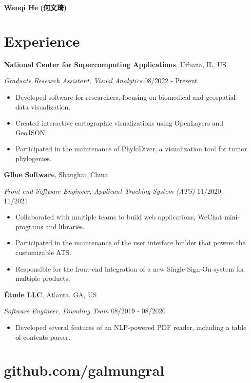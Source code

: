 \documentclass[12pt]{article}
\begin{document}
{\Huge\bf Wenqi He} {\Large\bf\cjkfont (何文琦)}

\section*{Experience}

\textbf{National Center for Supercomputing Applications}, Urbana, IL, US

\textit{Graduate Research Assistant, Visual Analytics} \hfill 08/2022 - Present

\begin{itemize}
\item Developed software for researchers, focusing on biomedical and geospatial data visualization.
\item Created interactive cartographic visualizations using OpenLayers and GeoJSON.
\item Participated in the maintenance of PhyloDiver, a visualization tool for tumor phylogenies.
\end{itemize}

\textbf{Gllue Software}, Shanghai, China

\textit{Front-end Software Engineer, Applicant Tracking System (ATS)} \hfill 11/2020 - 11/2021

\begin{itemize}
\item Collaborated with multiple teams to build web applications, WeChat mini-programs and libraries.
\item Participated in the maintenance of the user interface builder that powers the customizable ATS.
\item Responsible for the front-end integration of a new Single Sign-On system for multiple products.
\end{itemize}

\textbf{Étude LLC}, Atlanta, GA, US

\textit{Software Engineer, Founding Team} \hfill 08/2019 - 08/2020

\begin{itemize}
\item Developed several features of an NLP-powered PDF reader, including a table of contents parser.
\end{itemize}

\section*{{github.com/galmungral}}
\end{document}
